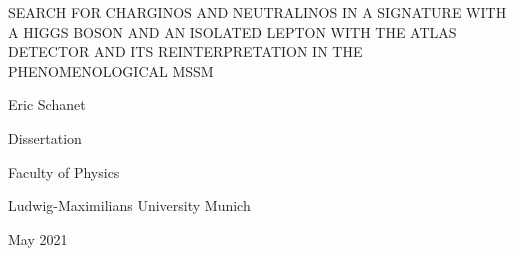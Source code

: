 \documentclass[12pt, oneside]{book}
\begin{document}
 
\thispagestyle{empty}
\begin{center}
\begin{minipage}{1\textwidth}
    \centering
    {\Large\uppercase{Search for charginos and neutralinos in a signature with a Higgs boson and an isolated lepton with the ATLAS detector and its reinterpretation in the phenomenological MSSM}\par}
    \vspace{3cm}
    {\Large Eric Schanet\par}
    \vspace{7cm}
    {\Large Dissertation\par}
    {\Large Faculty of Physics\par}
    {\Large Ludwig-Maximilians University Munich\par}
    \vspace{3cm}
    {\Large May 2021}
\end{minipage}
\end{center}
\clearpage
 
\end{document}
